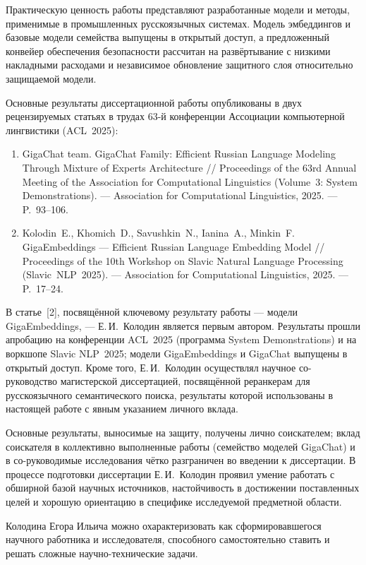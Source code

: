 \documentclass[14pt,a4paper]{extarticle}
\begin{document}
Практическую ценность работы представляют разработанные модели и методы, применимые в промышленных русскоязычных системах. Модель эмбеддингов и базовые модели семейства выпущены в открытый доступ, а предложенный конвейер обеспечения безопасности рассчитан на развёртывание с низкими накладными расходами и независимое обновление защитного слоя относительно защищаемой модели.

Основные результаты диссертационной работы опубликованы в двух рецензируемых статьях в трудах 63-й конференции Ассоциации компьютерной лингвистики (ACL~2025):
\begin{enumerate}
    \item GigaChat team. GigaChat Family: Efficient Russian Language Modeling Through Mixture of Experts Architecture // Proceedings of the 63rd Annual Meeting of the Association for Computational Linguistics (Volume~3: System Demonstrations). --- Association for Computational Linguistics, 2025. --- P.~93--106.
    \item Kolodin~E., Khomich~D., Savushkin~N., Ianina~A., Minkin~F. GigaEmbeddings --- Efficient Russian Language Embedding Model // Proceedings of the 10th Workshop on Slavic Natural Language Processing (Slavic~NLP~2025). --- Association for Computational Linguistics, 2025. --- P.~17--24.
\end{enumerate}
В статье~[2], посвящённой ключевому результату работы --- модели GigaEmbeddings, --- Е.\,И.~Колодин является первым автором. Результаты прошли апробацию на конференции ACL~2025 (программа System Demonstrations) и на воркшопе Slavic NLP~2025; модели GigaEmbeddings и GigaChat выпущены в открытый доступ. Кроме того, Е.\,И.~Колодин осуществлял научное со-руководство магистерской диссертацией, посвящённой реранкерам для русскоязычного семантического поиска, результаты которой использованы в настоящей работе с явным указанием личного вклада.

Основные результаты, выносимые на защиту, получены лично соискателем; вклад соискателя в коллективно выполненные работы (семейство моделей GigaChat) и в со-руководимые исследования чётко разграничен во введении к диссертации. В процессе подготовки диссертации Е.\,И.~Колодин проявил умение работать с обширной базой научных источников, настойчивость в достижении поставленных целей и хорошую ориентацию в специфике исследуемой предметной области.

Колодина Егора Ильича можно охарактеризовать как сформировавшегося научного работника и исследователя, способного самостоятельно ставить и решать сложные научно-технические задачи.
\end{document}
